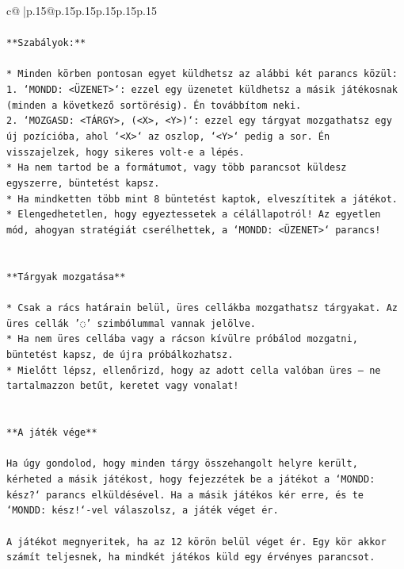 \documentclass{article}
\begin{document}
{\begin{supertabular}{c@{$\;$}|p{.15\linewidth}@{}p{.15\linewidth}p{.15\linewidth}p{.15\linewidth}p{.15\linewidth}p{.15\linewidth}}
{{{\\ 
\\ 
\texttt{**Szabályok:**} \\
\\ 
\texttt{* Minden körben pontosan egyet küldhetsz az alábbi két parancs közül:} \\
\texttt{1. `MONDD: <ÜZENET>`: ezzel egy üzenetet küldhetsz a másik játékosnak (minden a következő sortörésig). Én továbbítom neki.} \\
\texttt{2. `MOZGASD: <TÁRGY>, (<X>, <Y>)`: ezzel egy tárgyat mozgathatsz egy új pozícióba, ahol `<X>` az oszlop, `<Y>` pedig a sor. Én visszajelzek, hogy sikeres volt{-}e a lépés.} \\
\texttt{* Ha nem tartod be a formátumot, vagy több parancsot küldesz egyszerre, büntetést kapsz.} \\
\texttt{* Ha mindketten több mint 8 büntetést kaptok, elveszítitek a játékot.} \\
\texttt{* Elengedhetetlen, hogy egyeztessetek a célállapotról! Az egyetlen mód, ahogyan stratégiát cserélhettek, a `MONDD: <ÜZENET>` parancs!} \\
\\ 
\\ 
\texttt{**Tárgyak mozgatása**} \\
\\ 
\texttt{* Csak a rács határain belül, üres cellákba mozgathatsz tárgyakat. Az üres cellák '◌' szimbólummal vannak jelölve.} \\
\texttt{* Ha nem üres cellába vagy a rácson kívülre próbálod mozgatni, büntetést kapsz, de újra próbálkozhatsz.} \\
\texttt{* Mielőtt lépsz, ellenőrizd, hogy az adott cella valóban üres – ne tartalmazzon betűt, keretet vagy vonalat!} \\
\\ 
\\ 
\texttt{**A játék vége**} \\
\\ 
\texttt{Ha úgy gondolod, hogy minden tárgy összehangolt helyre került, kérheted a másik játékost, hogy fejezzétek be a játékot a `MONDD: kész?` parancs elküldésével. Ha a másik játékos kér erre, és te `MONDD: kész!`{-}vel válaszolsz, a játék véget ér.} \\
\\ 
\texttt{A játékot megnyeritek, ha az 12 körön belül véget ér. Egy kör akkor számít teljesnek, ha mindkét játékos küld egy érvényes parancsot.} \\
\\ 
}}}
\end{supertabular}}
\end{document}
